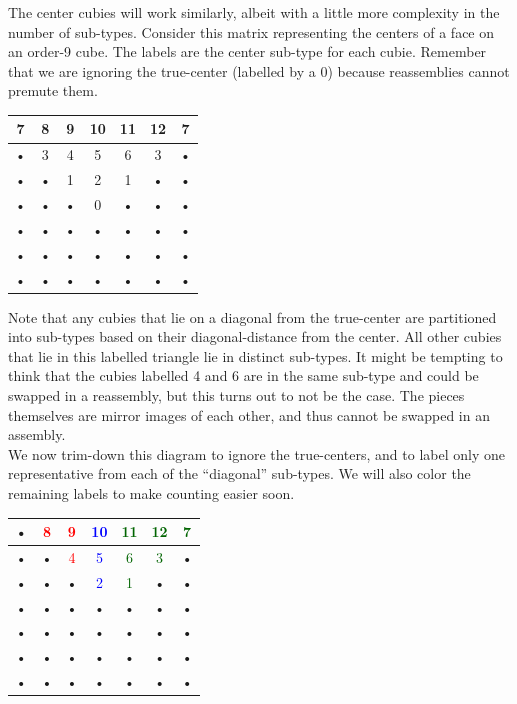 \documentclass[10pt,letterpaper]{report}
\begin{document}
The center cubies will work similarly, albeit with a little more complexity in the number of sub-types.  Consider this matrix representing the centers of a face on an order-9 cube.  The labels are the center sub-type for each cubie.  Remember that we are ignoring the true-center (labelled by a 0) because reassemblies cannot premute them.
\begin{center}
\begin{tabular}{|c|c|c|c|c|c|c|}
\hline 
7 & 8 & 9 & 10 & 11 & 12 & 7 \\ 
\hline 
• & 3 & 4 & 5 & 6 & 3 & • \\ 
\hline 
• & • & 1 & 2 & 1 & • & • \\ 
\hline 
• & • & • & 0 & • & • & • \\ 
\hline 
• & • & • & • & • & • & • \\ 
\hline 
• & • & • & • & • & • & • \\ 
\hline 
• & • & • & • & • & • & • \\ 
\hline 
\end{tabular} 
\end{center}

Note that any cubies that lie on a diagonal from the true-center are partitioned into sub-types based on their diagonal-distance from the center.  All other cubies that lie in this labelled triangle lie in distinct sub-types.  It might be tempting to think that the cubies labelled 4 and 6 are in the same sub-type and could be swapped in a reassembly, but this turns out to not be the case.  The pieces themselves are mirror images of each other, and thus cannot be swapped in an assembly. \\

We now trim-down this diagram to ignore the true-centers, and to label only one representative from each of the ``diagonal'' sub-types.  We will also color the remaining labels to make counting easier soon.

\begin{center}
\begin{tabular}{|c|c|c|c|c|c|c|}
\hline 
• & \textcolor{red}{8} & \textcolor{red}{9} & \textcolor{blue}{10} & \textcolor{darkgreen}{11} & \textcolor{darkgreen}{12} & \textcolor{darkgreen}{7} \\ 
\hline 
• & • & \textcolor{red}{4} & \textcolor{blue}{5} & \textcolor{darkgreen}{6} & \textcolor{darkgreen}{3} & • \\ 
\hline 
• & • & • & \textcolor{blue}{2} & \textcolor{darkgreen}{1} & • & • \\ 
\hline 
• & • & • & • & • & • & • \\ 
\hline 
• & • & • & • & • & • & • \\ 
\hline 
• & • & • & • & • & • & • \\ 
\hline 
• & • & • & • & • & • & • \\ 
\hline 
\end{tabular} 
\end{center}
\end{document}
